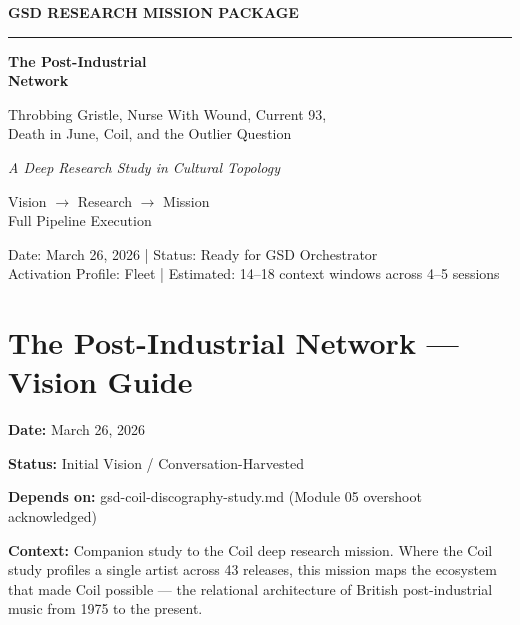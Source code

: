 \documentclass[11pt,letterpaper]{article}
\newcommand{\stageheader}[2]{%
  \noindent\colorbox{#2}{\makebox[\textwidth][l]{%
    \textcolor{white}{\bfseries\sffamily\hspace{6pt}#1\hspace{6pt}}}}%
  \vspace{0.5em}\par%
}
\newcommand{\metafield}[2]{\textbf{\sffamily #1} #2\par}
\begin{document}
\thispagestyle{empty}
\begin{center}
\vspace*{3cm}

{\small\sffamily\textcolor{primary}{\textbf{GSD RESEARCH MISSION PACKAGE}}}

\vspace{0.3cm}
\textcolor{bordergray}{\rule{8cm}{0.4pt}}

\vspace{1.5cm}
{\fontsize{28}{34}\selectfont\bfseries\sffamily\textcolor{primary}{The Post-Industrial\\[0.3em]Network}}

\vspace{0.8cm}
{\Large\sffamily\textcolor{secondary}{Throbbing Gristle, Nurse With Wound, Current 93,\\Death in June, Coil, and the Outlier Question}}

\vspace{0.5cm}
{\large\sffamily\itshape\textcolor{tertiary}{A Deep Research Study in Cultural Topology}}

\vspace{3cm}
{\sffamily\textcolor{accent}{Vision $\rightarrow$ Research $\rightarrow$ Mission}}\\[0.3em]
{\small\sffamily\textcolor{accent}{Full Pipeline Execution}}

\vspace{3cm}
{\small\sffamily\textcolor{subtlegray}{Date: March 26, 2026  |  Status: Ready for GSD Orchestrator}}\\[0.3em]
{\small\sffamily\textcolor{subtlegray}{Activation Profile: Fleet  |  Estimated: 14--18 context windows across 4--5 sessions}}
\end{center}
\newpage

\tableofcontents
\newpage

\stageheader{STAGE 1 --- VISION DOCUMENT}{primary}

\section{The Post-Industrial Network --- Vision Guide}

\metafield{Date:}{March 26, 2026}
\metafield{Status:}{Initial Vision / Conversation-Harvested}
\metafield{Depends on:}{gsd-coil-discography-study.md (Module 05 overshoot acknowledged)}
\metafield{Context:}{Companion study to the Coil deep research mission. Where the Coil study profiles a single
artist across 43 releases, this mission maps the ecosystem that made Coil possible — the relational
architecture of British post-industrial music from 1975 to the present.}
\end{document}
